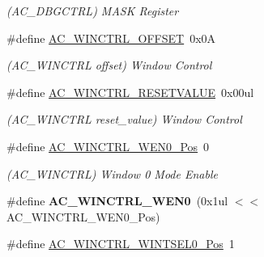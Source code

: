 \begin{DoxyCompactItemize}
\begin{DoxyCompactList}\small\item\em (A\+C\+\_\+\+D\+B\+G\+C\+T\+R\+L) M\+A\+S\+K Register \end{DoxyCompactList}\item 
\hypertarget{group___s_a_m_l21___a_c_ga7075f883b140c498d62e6de94e22f975}{}\#define \hyperlink{group___s_a_m_l21___a_c_ga7075f883b140c498d62e6de94e22f975}{A\+C\+\_\+\+W\+I\+N\+C\+T\+R\+L\+\_\+\+O\+F\+F\+S\+E\+T}~0x0\+A\label{group___s_a_m_l21___a_c_ga7075f883b140c498d62e6de94e22f975}

\begin{DoxyCompactList}\small\item\em (A\+C\+\_\+\+W\+I\+N\+C\+T\+R\+L offset) Window Control \end{DoxyCompactList}\item 
\hypertarget{group___s_a_m_l21___a_c_gaef191946603b0aebaf28aebcc5331ce8}{}\#define \hyperlink{group___s_a_m_l21___a_c_gaef191946603b0aebaf28aebcc5331ce8}{A\+C\+\_\+\+W\+I\+N\+C\+T\+R\+L\+\_\+\+R\+E\+S\+E\+T\+V\+A\+L\+U\+E}~0x00ul\label{group___s_a_m_l21___a_c_gaef191946603b0aebaf28aebcc5331ce8}

\begin{DoxyCompactList}\small\item\em (A\+C\+\_\+\+W\+I\+N\+C\+T\+R\+L reset\+\_\+value) Window Control \end{DoxyCompactList}\item 
\hypertarget{group___s_a_m_l21___a_c_gab5ded8b8be62ba307c7df588787f6754}{}\#define \hyperlink{group___s_a_m_l21___a_c_gab5ded8b8be62ba307c7df588787f6754}{A\+C\+\_\+\+W\+I\+N\+C\+T\+R\+L\+\_\+\+W\+E\+N0\+\_\+\+Pos}~0\label{group___s_a_m_l21___a_c_gab5ded8b8be62ba307c7df588787f6754}

\begin{DoxyCompactList}\small\item\em (A\+C\+\_\+\+W\+I\+N\+C\+T\+R\+L) Window 0 Mode Enable \end{DoxyCompactList}\item 
\hypertarget{group___s_a_m_l21___a_c_gae23d36c4d876b6ca53cb1743c9645c98}{}\#define {\bfseries A\+C\+\_\+\+W\+I\+N\+C\+T\+R\+L\+\_\+\+W\+E\+N0}~(0x1ul $<$$<$ A\+C\+\_\+\+W\+I\+N\+C\+T\+R\+L\+\_\+\+W\+E\+N0\+\_\+\+Pos)\label{group___s_a_m_l21___a_c_gae23d36c4d876b6ca53cb1743c9645c98}

\item 
\hypertarget{group___s_a_m_l21___a_c_gaf7bc05aa7122fff6ea05ae690cbc8486}{}\#define \hyperlink{group___s_a_m_l21___a_c_gaf7bc05aa7122fff6ea05ae690cbc8486}{A\+C\+\_\+\+W\+I\+N\+C\+T\+R\+L\+\_\+\+W\+I\+N\+T\+S\+E\+L0\+\_\+\+Pos}~1\label{group___s_a_m_l21___a_c_gaf7bc05aa7122fff6ea05ae690cbc8486}


\end{DoxyCompactItemize}
